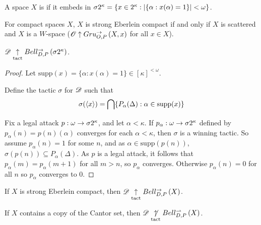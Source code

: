 \documentclass[11pt]{article}
\begin{document}
  \begin{definition}
    A space $X$ is  if it embeds in
    $\sigma2^{\kappa}=\{x\in2^\kappa:|\{\alpha:x(\alpha)=1\}|<\omega\}$.
  \end{definition}

  \begin{theorem}[Gruenhage]
    For compact spaces $X$,
    $X$ is strong Eberlein compact if and only if
    $X$ is scattered and $X$ is a $W$-space
    ($\mathscr{O}\uparrow Gru_{O,P}^{\to}\left({X},{x}\right)$ for all $x\in X$).
  \end{theorem}

  \begin{theorem}
    $\mathscr{D}\underset{\text{tact}}{\uparrow}Bell_{D,P}^{\to}\left({\sigma2^{\kappa}}\right)$.
  \end{theorem}

  \begin{proof}
    Let $\text{supp}(x)=\{\alpha:x(\alpha)=1\}\in[\kappa]^{<\omega}$.

    Define the tactic $\sigma$ for $\mathscr{D}$ such that
      \[
        \sigma(\langle x\rangle)
          =
        \bigcap\{
          P_\alpha(\Delta) : \alpha\in\text{supp}(x)
        \}
      \]

    Fix a legal attack $p:\omega\to\sigma2^{\kappa}$, and let
    $\alpha<\kappa$. If $p_\alpha:\omega\to\sigma2^{\kappa}$ defined by
    $p_\alpha(n)=p(n)(\alpha)$ converges for each $\alpha<\kappa$,
    then $\sigma$ is a winning tactic. So assume
    $p_\alpha(n)=1$ for some $n$, and as $\alpha\in\text{supp}(p(n))$,
    $\sigma(p(n))\subseteq P_\alpha(\Delta)$. As $p$ is a legal attack,
    it follows that $p_\alpha(m)=p_\alpha(m+1)$ for all $m>n$, so
    $p_\alpha$ converges. Otherwise $p_\alpha(n)=0$ for all $n$ so
    $p_\alpha$ converges to $0$.
  \end{proof}

  \begin{corollary}
    If $X$ is strong Eberlein compact, then $\mathscr{D}\underset{\text{tact}}{\uparrow}Bell_{D,P}^{\to}\left({X}\right)$.
  \end{corollary}

  \begin{theorem}\label{cantorCopy}
    If $X$ contains a copy of the Cantor set, then
    $\mathscr{D}\underset{\text{tact}}{\not\uparrow}Bell_{D,P}^{\rightharpoonup}\left({X}\right)$.
  \end{theorem}
\end{document}
